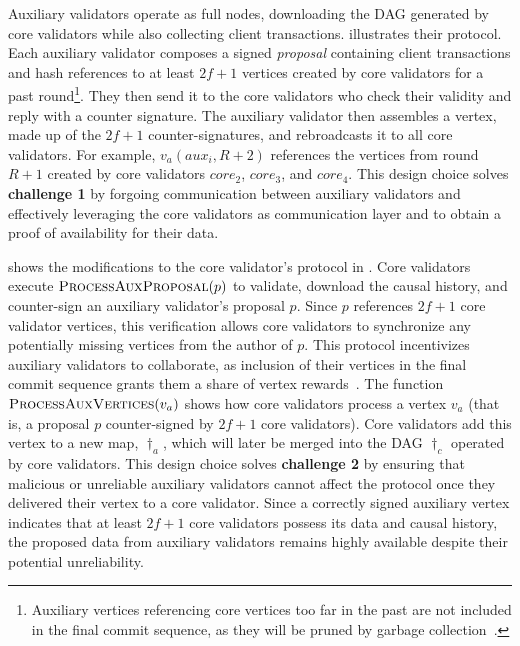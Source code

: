 Auxiliary validators operate as full nodes, downloading the DAG generated by core validators while also collecting client transactions.  illustrates their protocol. Each auxiliary validator composes a signed \emph{proposal} containing client transactions and hash references to at least $2f + 1$ vertices created by core validators for a past round\footnote{
    Auxiliary vertices referencing core vertices too far in the past are not included in the final commit sequence, as they will be pruned by garbage collection~\cite{narwhal}.
}. They then send it to the core validators who check their validity and reply with a counter signature. The auxiliary validator then assembles a vertex, made up of the $2f + 1$ counter-signatures, and rebroadcasts it to all core validators. For example, $v_a(aux_i, R+2)$ references the vertices from round $R+1$ created by core validators $core_2$, $core_3$, and $core_4$.
%
This design choice solves \textbf{challenge 1} by forgoing communication between auxiliary validators and effectively leveraging the core validators as communication layer and to obtain a proof of availability for their data.

 shows the modifications to the core validator's protocol in . Core validators execute $\Call{ProcessAuxProposal}{p}$ to validate, download the causal history, and counter-sign an auxiliary validator's proposal $p$. Since $p$ references $2f + 1$ core validator vertices, this verification allows core validators to synchronize any potentially missing vertices from the author of $p$. This protocol incentivizes auxiliary validators to collaborate, as inclusion of their vertices in the final commit sequence grants them a share of vertex rewards~\cite{ethereum}. The function $\Call{ProcessAuxVertices}{v_a}$ shows how core validators process a vertex $v_a$ (that is, a proposal $p$ counter-signed by $2f + 1$ core validators). Core validators add this vertex to a new map, $\dag_a$, which will later be merged into the DAG $\dag_c$ operated by core validators.
%
This design choice solves \textbf{challenge 2} by ensuring that malicious or unreliable auxiliary validators cannot affect the protocol once they delivered their vertex to a core validator. Since a correctly signed auxiliary vertex indicates that at least $2f + 1$ core validators possess its data and causal history, the proposed data from auxiliary validators remains highly available despite their potential unreliability.

